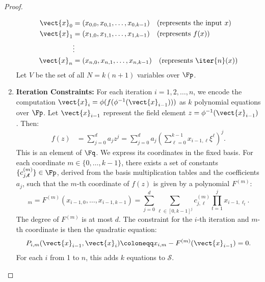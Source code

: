 \begin{proof}
\begin{definition}
\begin{enumerate}
\begin{align*}
                            \vect{x}_0 &= (x_{0,0}, x_{0,1}, \ldots, x_{0,k-1}) \quad \text{(represents the input $x$)} \\
                            \vect{x}_1 &= (x_{1,0}, x_{1,1}, \ldots, x_{1,k-1}) \quad \text{(represents $f(x)$)} \\
                            &\vdots \\
                            \vect{x}_n &= (x_{n,0}, x_{n,1}, \ldots, x_{n,k-1}) \quad \text{(represents $\iter{n}(x)$)}
                        \end{align*}
                        Let $V$ be the set of all $N = k(n+1)$ variables over $\Fp$.
                        \item \textbf{Iteration Constraints:} For each iteration $i = 1, 2, \ldots, n$, we encode the computation $\vect{x}_i = \phi(f(\phi^{-1}(\vect{x}_{i-1})))$ as $k$ polynomial equations over $\Fp$. Let $\vect{x}_{i-1}$ represent the field element $z = \phi^{-1}(\vect{x}_{i-1})$. Then:
                        \begin{align*}
                            f(z) &= \sum_{j=0}^{d} a_j z^j = \sum_{j=0}^{d} a_j \left( \sum_{\ell=0}^{k-1} x_{i-1,\ell} \xi^{\ell} \right)^j.
                        \end{align*}
                        This is an element of $\Fq$. We express its coordinates in the fixed basis. For each coordinate $m \in \{0, \ldots, k-1\}$, there exists a set of constants $\{c_{j, \boldsymbol{\ell}}^{(m)}\} \in \Fp$, derived from the basis multiplication tables and the coefficients $a_j$, such that the $m$-th coordinate of $f(z)$ is given by a polynomial $F^{(m)}$:
                        \begin{equation}
                            [\phi(f(z))]_m = F^{(m)}(x_{i-1,0}, \ldots, x_{i-1,k-1}) = \sum_{j=0}^{d} \sum_{\boldsymbol{\ell} \in [0, k-1]^j} c_{j, \boldsymbol{\ell}}^{(m)} \prod_{t=1}^{j} x_{i-1, \ell_t}.
                        \end{equation}
                        The degree of $F^{(m)}$ is at most $d$. The constraint for the $i$-th iteration and $m$-th coordinate is then the quadratic equation:
                        \begin{equation}\label{eq:iteration-constraint}
                            P_{i,m}(\vect{x}_{i-1}, \vect{x}_i) \coloneqq x_{i,m} - F^{(m)}(\vect{x}_{i-1}) = 0.
                        \end{equation}
                        For each $i$ from 1 to $n$, this adds $k$ equations to $\mathcal{S}$.

\end{enumerate}
\end{definition}
\end{proof}
